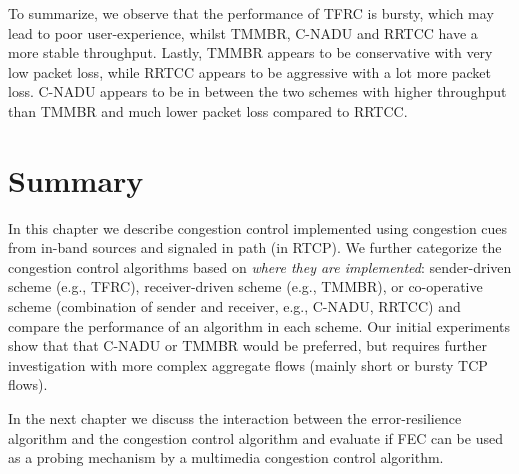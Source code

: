 To summarize, we observe that the performance of TFRC is bursty, which may
lead to poor user-experience, whilst TMMBR, C-NADU and RRTCC have a more
stable throughput. Lastly, TMMBR appears to be conservative with very low
packet loss, while RRTCC appears to be aggressive with a lot more packet loss.
C-NADU appears to be in between the two schemes with higher throughput than
TMMBR and much lower packet loss compared to RRTCC. 

\section{Summary}

In this chapter we describe congestion control implemented using congestion
cues from in-band sources and signaled in path (in RTCP). We further
categorize the congestion control algorithms based on \emph{where they are
implemented}: sender-driven scheme (e.g., TFRC), receiver-driven scheme (e.g.,
TMMBR), or co-operative scheme (combination of sender and receiver, e.g.,
C-NADU, RRTCC) and compare the performance of an algorithm in each scheme. Our
initial experiments show that that C-NADU or TMMBR would be preferred, but
requires further investigation with more complex aggregate flows (mainly short
or bursty TCP flows).

In the next chapter we discuss the interaction between the error-resilience
algorithm and the congestion control algorithm and evaluate if FEC can be used
as a probing mechanism by a multimedia congestion control algorithm.
